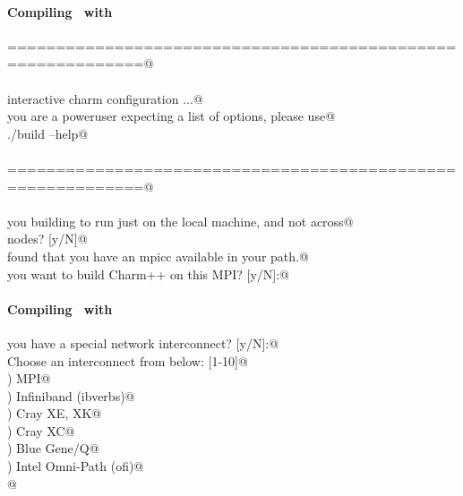 \begin{frame}[fragile] 
\secframetitle{\ssInstallCharm}
\framesubtitle{Compiling \charm\ with }
\color{black}
\footnotesize

\prompt{}
\pause

\verb@============================================================@ \\
\ \\
\verb@Begin interactive charm configuration ...@\\
\verb@If you are a poweruser expecting a list of options, please use@ \\
\verb@   ./build --help@\\
\ \\
\verb@============================================================@ \\
\ \\
\verb@Are you building to run just on the local machine, and not across@ \\
\verb@multiple nodes? [y/N]@ \\
\pause
\verb@I found that you have an mpicc available in your path.@ \\
\verb@Do you want to build Charm++ on this MPI? [y/N]:@ \\
\end{frame}


\begin{frame}[fragile] 
\secframetitle{\ssInstallCharm}
\framesubtitle{Compiling \charm\ with }
\color{black}
\footnotesize

\verb@Do you have a special network interconnect? [y/N]:@
\pause
\verb@y@ \\
\verb@	Choose an interconnect from below: [1-10]@ \\
) MPI@ \\
) Infiniband (ibverbs)@ \\
) Cray XE, XK@ \\
) Cray XC@ \\
) Blue Gene/Q@ \\
) Intel Omni-Path (ofi)@ \\
\verb@  @
\end{frame}



